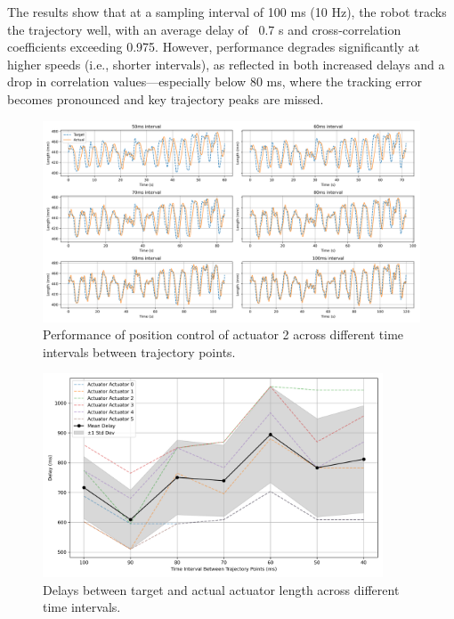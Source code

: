 The results show that at a sampling interval of 100 ms (10 Hz), the robot tracks the trajectory well, with an average delay of ~0.7 s and 
cross-correlation coefficients exceeding 0.975. However, performance degrades significantly at higher speeds (i.e., shorter intervals), 
as reflected in both increased delays and a drop in correlation values—especially below 80 ms, where the tracking error becomes pronounced 
and key trajectory peaks are missed.

\begin{figure}[H]
    \centering
    \includegraphics[width=\textwidth]{figures/actuator_2_trajectories.png}
    \caption{Performance of position control of actuator 2 across different time intervals between trajectory points.}
    \label{fig:position_control}
\end{figure}

\begin{figure}[H]
    \centering
    \includegraphics[width=0.9\textwidth]{figures/actuator_delays.png}
    \caption{Delays between target and actual actuator length across different time intervals.}
    \label{fig:actuator_delays_2}
\end{figure}

